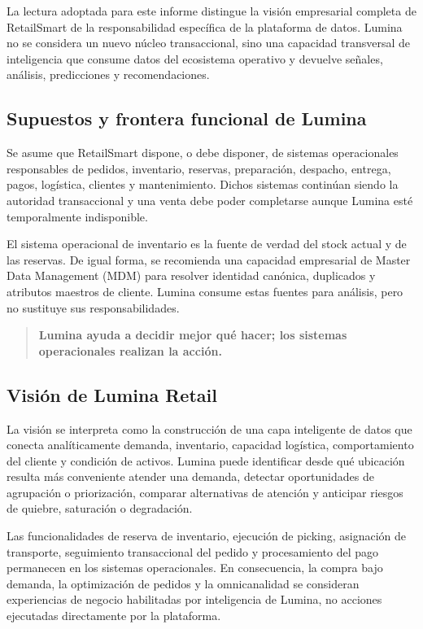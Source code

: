 \documentclass[11pt,a4paper]{article}
\begin{document}
La lectura adoptada para este informe distingue la visión empresarial completa de RetailSmart de la responsabilidad específica de la plataforma de datos. Lumina no se considera un nuevo núcleo transaccional, sino una capacidad transversal de inteligencia que consume datos del ecosistema operativo y devuelve señales, análisis, predicciones y recomendaciones.

\subsection{Supuestos y frontera funcional de Lumina}
Se asume que RetailSmart dispone, o debe disponer, de sistemas operacionales responsables de pedidos, inventario, reservas, preparación, despacho, entrega, pagos, logística, clientes y mantenimiento. Dichos sistemas continúan siendo la autoridad transaccional y una venta debe poder completarse aunque Lumina esté temporalmente indisponible.

El sistema operacional de inventario es la fuente de verdad del stock actual y de las reservas. De igual forma, se recomienda una capacidad empresarial de Master Data Management (MDM) para resolver identidad canónica, duplicados y atributos maestros de cliente. Lumina consume estas fuentes para análisis, pero no sustituye sus responsabilidades.

\begin{quote}
\textbf{Lumina ayuda a decidir mejor qué hacer; los sistemas operacionales realizan la acción.}
\end{quote}

\subsection{Visión de Lumina Retail}
La visión se interpreta como la construcción de una capa inteligente de datos que conecta analíticamente demanda, inventario, capacidad logística, comportamiento del cliente y condición de activos. Lumina puede identificar desde qué ubicación resulta más conveniente atender una demanda, detectar oportunidades de agrupación o priorización, comparar alternativas de atención y anticipar riesgos de quiebre, saturación o degradación.

Las funcionalidades de reserva de inventario, ejecución de picking, asignación de transporte, seguimiento transaccional del pedido y procesamiento del pago permanecen en los sistemas operacionales. En consecuencia, la compra bajo demanda, la optimización de pedidos y la omnicanalidad se consideran experiencias de negocio habilitadas por inteligencia de Lumina, no acciones ejecutadas directamente por la plataforma.
\end{document}
